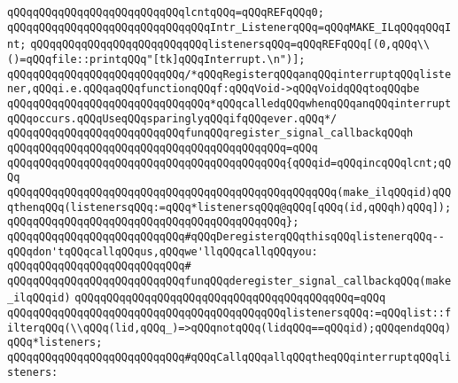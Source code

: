 \newline
\verb|qQQqqQQqqQQqqQQqqQQqqQQqqQQqlcntqQQq=qQQqREFqQQq0;|\newline
\newline
\verb|qQQqqQQqqQQqqQQqqQQqqQQqqQQqqQQqIntr_ListenerqQQq=qQQqMAKE_ILqQQqqQQqInt;|\newline
\newline
\verb|qQQqqQQqqQQqqQQqqQQqqQQqqQQqlistenersqQQq=qQQqREFqQQq[(0,qQQq\\()=qQQqfile::printqQQq"[tk]qQQqInterrupt.\n")];|\newline
\newline
\verb|qQQqqQQqqQQqqQQqqQQqqQQqqQQq/*qQQqRegisterqQQqanqQQqinterruptqQQqlistener,qQQqi.e.qQQqaqQQqfunctionqQQqf:qQQqVoid->qQQqVoidqQQqtoqQQqbe|\newline
\verb|qQQqqQQqqQQqqQQqqQQqqQQqqQQqqQQq*qQQqcalledqQQqwhenqQQqanqQQqinterruptqQQqoccurs.qQQqUseqQQqsparinglyqQQqifqQQqever.qQQq*/|\newline
\verb|qQQqqQQqqQQqqQQqqQQqqQQqqQQqfunqQQqregister_signal_callbackqQQqh|\newline
\verb|qQQqqQQqqQQqqQQqqQQqqQQqqQQqqQQqqQQqqQQqqQQq=qQQq|\newline
\verb|qQQqqQQqqQQqqQQqqQQqqQQqqQQqqQQqqQQqqQQqqQQq{qQQqid=qQQqincqQQqlcnt;qQQq|\newline
\verb|qQQqqQQqqQQqqQQqqQQqqQQqqQQqqQQqqQQqqQQqqQQqqQQqqQQq(make_ilqQQqid)qQQqthenqQQq(listenersqQQq:=qQQq*listenersqQQq@qQQq[qQQq(id,qQQqh)qQQq]);|\newline
\verb|qQQqqQQqqQQqqQQqqQQqqQQqqQQqqQQqqQQqqQQqqQQq};|\newline
\newline
\verb|qQQqqQQqqQQqqQQqqQQqqQQqqQQq#qQQqDeregisterqQQqthisqQQqlistenerqQQq--qQQqdon'tqQQqcallqQQqus,qQQqwe'llqQQqcallqQQqyou:|\newline
\verb|qQQqqQQqqQQqqQQqqQQqqQQqqQQq#|\newline
\verb|qQQqqQQqqQQqqQQqqQQqqQQqqQQqfunqQQqderegister_signal_callbackqQQq(make_ilqQQqid)|\newline
\verb|qQQqqQQqqQQqqQQqqQQqqQQqqQQqqQQqqQQqqQQqqQQq=qQQq|\newline
\verb|qQQqqQQqqQQqqQQqqQQqqQQqqQQqqQQqqQQqqQQqqQQqlistenersqQQq:=qQQqlist::filterqQQq(\\qQQq(lid,qQQq_)=>qQQqnotqQQq(lidqQQq==qQQqid);qQQqendqQQq)qQQq*listeners;|\newline
\newline
\verb|qQQqqQQqqQQqqQQqqQQqqQQqqQQq#qQQqCallqQQqallqQQqtheqQQqinterruptqQQqlisteners:|\newline
